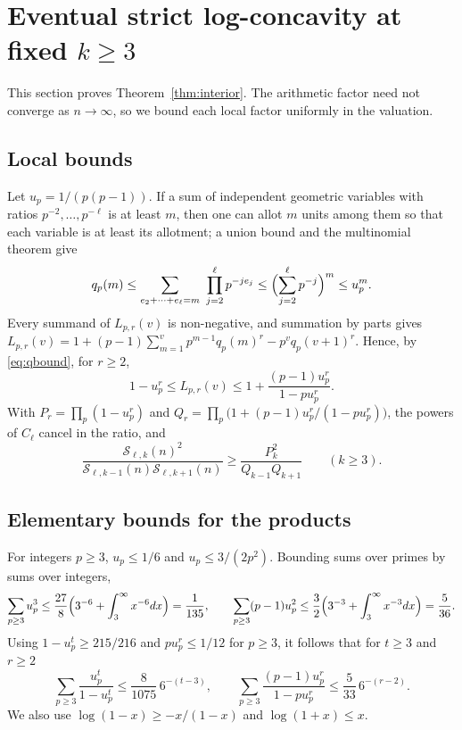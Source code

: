 \documentclass[11pt,a4paper]{article}
\theoremstyle{remark}
\numberwithin{equation}{section}
\newcommand{\Sing}{\mathcal S}
\begin{document}
\section{Eventual strict log-concavity at fixed \texorpdfstring{$k\ge3$}{k>=3}}\label{sec:interior}

This section proves Theorem~\ref{thm:interior}. The arithmetic factor need not converge as $n\to\infty$, so we bound each local factor uniformly in the valuation.

\subsection{Local bounds}
Let $u_p=1/(p(p-1))$. If a sum of independent geometric variables with ratios $p^{-2},\dots,p^{-\ell}$ is at least $m$, then one can allot $m$ units among them so that each variable is at least its allotment; a union bound and the multinomial theorem give
\begin{equation}\label{eq:qbound}
q_p(m)\le\sum_{e_2+\cdots+e_\ell=m}\ \prod_{j=2}^{\ell}p^{-je_j}\le\Bigl(\sum_{j=2}^{\ell}p^{-j}\Bigr)^m\le u_p^m .
\end{equation}
Every summand of $L_{p,r}(v)$ is non-negative, and summation by parts gives $L_{p,r}(v)=1+(p-1)\sum_{m=1}^{v}p^{m-1}q_p(m)^r-p^vq_p(v+1)^r$. Hence, by \eqref{eq:qbound}, for $r\ge2$,
\begin{equation}\label{eq:Lbounds}
1-u_p^r\le L_{p,r}(v)\le1+\frac{(p-1)u_p^r}{1-pu_p^r}.
\end{equation}
With $P_r=\prod_p(1-u_p^r)$ and $Q_r=\prod_p\bigl(1+(p-1)u_p^r/(1-pu_p^r)\bigr)$, the powers of $C_\ell$ cancel in the ratio, and
\begin{equation}\label{eq:SingRatio}
\frac{\Sing_{\ell,k}(n)^2}{\Sing_{\ell,k-1}(n)\Sing_{\ell,k+1}(n)}\ge\frac{P_k^2}{Q_{k-1}Q_{k+1}}\qquad(k\ge3).
\end{equation}

\subsection{Elementary bounds for the products}
For integers $p\ge3$, $u_p\le1/6$ and $u_p\le3/(2p^2)$. Bounding sums over primes by sums over integers,
\[
\sum_{p\ge3}u_p^3\le\frac{27}{8}\Bigl(3^{-6}+\int_3^\infty x^{-6}dx\Bigr)=\frac1{135},\qquad
\sum_{p\ge3}(p-1)u_p^2\le\frac32\Bigl(3^{-3}+\int_3^\infty x^{-3}dx\Bigr)=\frac5{36}.
\]
Using $1-u_p^t\ge215/216$ and $pu_p^r\le1/12$ for $p\ge3$, it follows that for $t\ge3$ and $r\ge2$
\begin{equation}\label{eq:sums}
\sum_{p\ge3}\frac{u_p^t}{1-u_p^t}\le\frac{8}{1075}\,6^{-(t-3)},\qquad
\sum_{p\ge3}\frac{(p-1)u_p^r}{1-pu_p^r}\le\frac5{33}\,6^{-(r-2)} .
\end{equation}
We also use $\log(1-x)\ge-x/(1-x)$ and $\log(1+x)\le x$.
\end{document}
